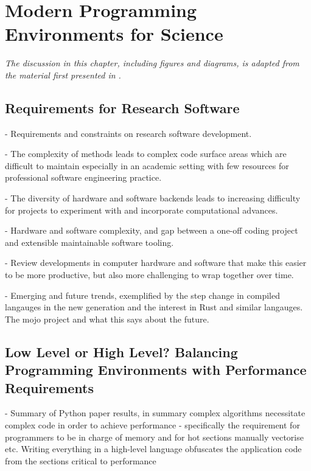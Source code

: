 \chapter{Modern Programming Environments for Science}\label{chpt:programming_for_science}
\thispagestyle{chaptertitle} %



\begin{center}
    \textit{The discussion in this chapter, including figures and diagrams, is adapted from the material first presented in \cite{kailasa2022pyexafmm}.}
\end{center}

\section{Requirements for Research Software}

- Requirements and constraints on research software development.

- The complexity of methods leads to complex code surface areas which are difficult to maintain especially in an academic setting with few resources for professional software engineering practice.

- The diversity of hardware and software backends leads to increasing difficulty for projects to experiment with and incorporate computational advances.

- Hardware and software complexity, and gap between a one-off coding project and extensible maintainable software tooling.

- Review developments in computer hardware and software that make this easier to be more productive, but also more challenging to wrap together over time.

- Emerging and future trends, exemplified by the step change in compiled langauges in the new generation and the interest in Rust and similar langauges. The mojo project and what this says about the future.


\section{Low Level or High Level? Balancing Programming Environments with Performance Requirements}

- Summary of Python paper results, in summary complex algorithms necessitate complex code in order to achieve performance - specifically the requirement for programmers to be in charge of memory and for hot sections manually vectorise etc. Writing everything in a high-level language obfuscates the application code from the sections critical to performance

